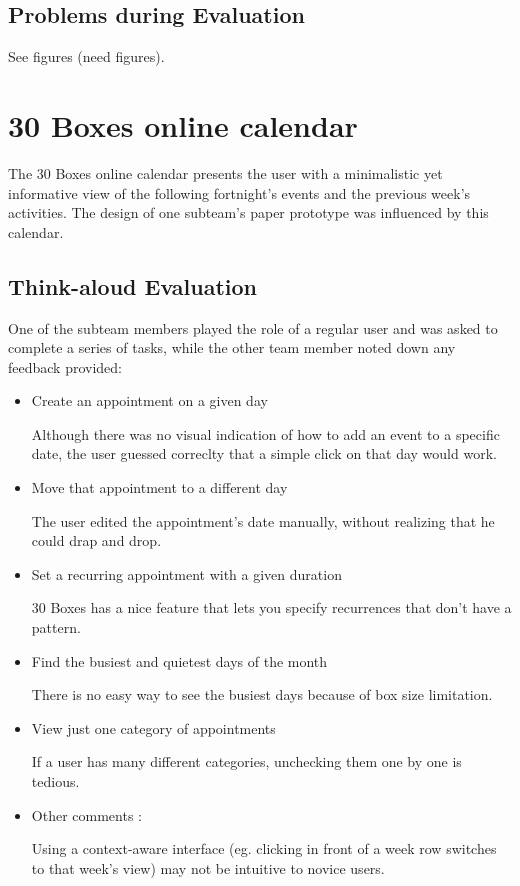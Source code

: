 \documentclass{article}
\begin{document}
\subsection{Problems during Evaluation}

See figures (need figures).

\section{30 Boxes online calendar}
The 30 Boxes online calendar presents the user with a minimalistic yet 
informative view of the following fortnight's events and the previous 
week's activities. The design of one subteam's paper prototype was influenced 
by this calendar. 
\subsection{Think-aloud Evaluation}
One of the subteam members played the role of a regular user and was asked to 
complete a series of tasks, while the other team member noted down any
feedback provided:
\begin{itemize}
\item Create an appointment on a given day

Although there was no visual indication of how to add an event to a specific
date, the user guessed correclty that a simple click on that day would work.

\item Move that appointment to a different day

The user edited the appointment's date manually, without realizing that he
could drap and drop.

\item Set a recurring appointment with a given duration

30 Boxes has a nice feature that lets you specify recurrences that don't have
a pattern.

\item Find the busiest and quietest days of the month

There is no easy way to see the busiest days because of box size limitation.

\item View just one category of appointments

If a user has many different categories, unchecking them one by one is tedious.

\item Other comments :

Using a context-aware interface (eg. clicking in front of a week row switches
to that week's view) may not be intuitive to novice users.

\end{itemize}
\end{document}
